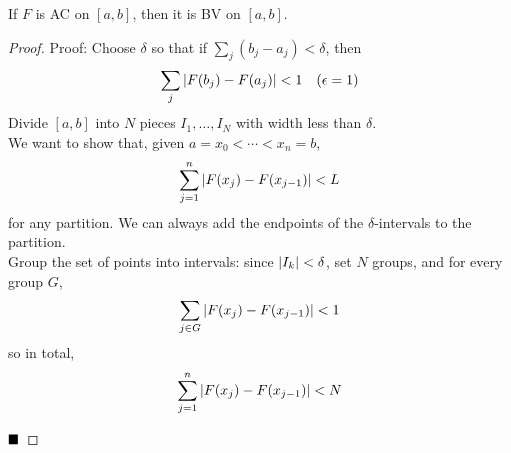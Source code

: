 \begin{lemma}
    If $F$ is AC on $[a, b]$, then it is BV on $[a, b]$.
\end{lemma}
\begin{proof}{Proof:}
    Choose $\delta$ so that if $\sum_j (b_j - a_j) < \delta$, then
    \[ \sum_j \left\lvert {F(b_j) - F(a_j)} \right\rvert < 1 \quad (\epsilon = 1) \]
    Divide $[a, b]$ into $N$ pieces $I_1, \ldots, I_N$ with width less than $\delta$.\\

    We want to show that, given $a = x_0 < \cdots < x_n = b$,
    \[ \sum_{j = 1}^{n} \left\lvert {F(x_j) - F(x_{j - 1})} \right\rvert < L \]
    for any partition.
    We can always add the endpoints of the $\delta$-intervals to the partition.\\

    Group the set of points into intervals: since $\left\lvert {I_k} \right\rvert < \delta$, set $N$ groups, and for every group $G$,
    \[ \sum_{j \in G} \left\lvert {F(x_j) - F(x_{j - 1})} \right\rvert < 1 \]
    so in total,
    \[ \sum_{j = 1}^{n} \left\lvert {F(x_j) - F(x_{j - 1})} \right\rvert < N \]

    $\qed$
\end{proof}


